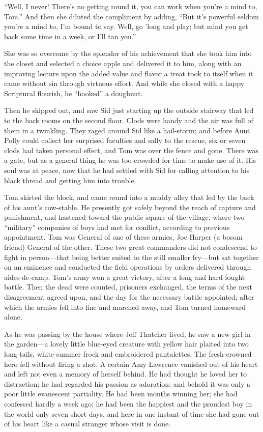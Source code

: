 \documentclass{book}
\begin{document}
“Well, I never! There’s no getting round it, you can work when you’re a mind to, Tom.” And then she diluted the compliment by adding, “But it’s powerful seldom you’re a mind to, I’m bound to say. Well, go ’long and play; but mind you get back some time in a week, or I’ll tan you.”

She was so overcome by the splendor of his achievement that she took him into the closet and selected a choice apple and delivered it to him, along with an improving lecture upon the added value and flavor a treat took to itself when it came without sin through virtuous effort. And while she closed with a happy Scriptural flourish, he “hooked” a doughnut.

Then he skipped out, and saw Sid just starting up the outside stairway that led to the back rooms on the second floor. Clods were handy and the air was full of them in a twinkling. They raged around Sid like a hail-storm; and before Aunt Polly could collect her surprised faculties and sally to the rescue, six or seven clods had taken personal effect, and Tom was over the fence and gone. There was a gate, but as a general thing he was too crowded for time to make use of it. His soul was at peace, now that he had settled with Sid for calling attention to his black thread and getting him into trouble.

Tom skirted the block, and came round into a muddy alley that led by the back of his aunt’s cow-stable. He presently got safely beyond the reach of capture and punishment, and hastened toward the public square of the village, where two “military” companies of boys had met for conflict, according to previous appointment. Tom was General of one of these armies, Joe Harper (a bosom friend) General of the other. These two great commanders did not condescend to fight in person—that being better suited to the still smaller fry—but sat together on an eminence and conducted the field operations by orders delivered through aides-de-camp. Tom’s army won a great victory, after a long and hard-fought battle. Then the dead were counted, prisoners exchanged, the terms of the next disagreement agreed upon, and the day for the necessary battle appointed; after which the armies fell into line and marched away, and Tom turned homeward alone.

As he was passing by the house where Jeff Thatcher lived, he saw a new girl in the garden—a lovely little blue-eyed creature with yellow hair plaited into two long-tails, white summer frock and embroidered pantalettes. The fresh-crowned hero fell without firing a shot. A certain Amy Lawrence vanished out of his heart and left not even a memory of herself behind. He had thought he loved her to distraction; he had regarded his passion as adoration; and behold it was only a poor little evanescent partiality. He had been months winning her; she had confessed hardly a week ago; he had been the happiest and the proudest boy in the world only seven short days, and here in one instant of time she had gone out of his heart like a casual stranger whose visit is done.
\end{document}
